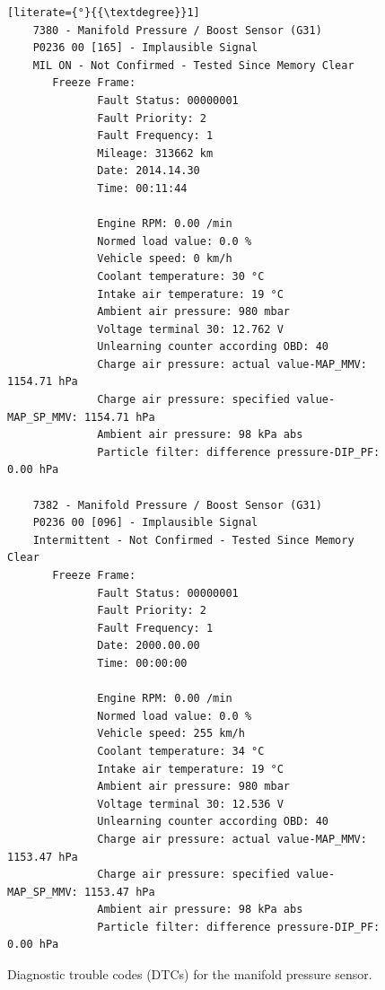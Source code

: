 \begin{figure}[ht]
\centering
\begin{lstlisting}[literate={°}{{\textdegree}}1]
    7380 - Manifold Pressure / Boost Sensor (G31)
    P0236 00 [165] - Implausible Signal
    MIL ON - Not Confirmed - Tested Since Memory Clear
       Freeze Frame:
              Fault Status: 00000001
              Fault Priority: 2
              Fault Frequency: 1
              Mileage: 313662 km
              Date: 2014.14.30
              Time: 00:11:44
    
              Engine RPM: 0.00 /min
              Normed load value: 0.0 %
              Vehicle speed: 0 km/h
              Coolant temperature: 30 °C
              Intake air temperature: 19 °C
              Ambient air pressure: 980 mbar
              Voltage terminal 30: 12.762 V
              Unlearning counter according OBD: 40
              Charge air pressure: actual value-MAP_MMV: 1154.71 hPa
              Charge air pressure: specified value-MAP_SP_MMV: 1154.71 hPa
              Ambient air pressure: 98 kPa abs
              Particle filter: difference pressure-DIP_PF: 0.00 hPa
    
    7382 - Manifold Pressure / Boost Sensor (G31)
    P0236 00 [096] - Implausible Signal
    Intermittent - Not Confirmed - Tested Since Memory Clear
       Freeze Frame:
              Fault Status: 00000001
              Fault Priority: 2
              Fault Frequency: 1
              Date: 2000.00.00
              Time: 00:00:00
    
              Engine RPM: 0.00 /min
              Normed load value: 0.0 %
              Vehicle speed: 255 km/h
              Coolant temperature: 34 °C
              Intake air temperature: 19 °C
              Ambient air pressure: 980 mbar
              Voltage terminal 30: 12.536 V
              Unlearning counter according OBD: 40
              Charge air pressure: actual value-MAP_MMV: 1153.47 hPa
              Charge air pressure: specified value-MAP_SP_MMV: 1153.47 hPa
              Ambient air pressure: 98 kPa abs
              Particle filter: difference pressure-DIP_PF: 0.00 hPa
\end{lstlisting}
\caption{Diagnostic trouble codes (DTCs) for the manifold pressure sensor.}
\label{fig:dtc_codes}
\end{figure}

